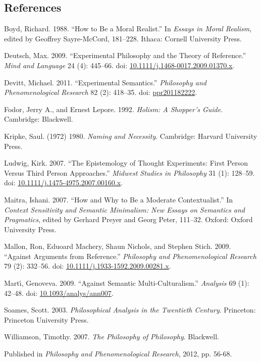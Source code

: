 \documentclass[
  11pt,
  letterpaper,
  DIV=11,
  numbers=noendperiod,
  twoside]{scrartcl}
\newlength{\cslhangindent}
\newenvironment{CSLReferences}[2] %
 {\begin{list}{}{%
  \setlength{\itemindent}{0pt}
  \setlength{\leftmargin}{0pt}
  \setlength{\parsep}{0pt}
  \ifodd #1
   \setlength{\leftmargin}{\cslhangindent}
   \setlength{\itemindent}{-1\cslhangindent}
  \fi
  \setlength{\itemsep}{#2\baselineskip}}}
 {\end{list}}
\begin{document}
\subsection*{References}\label{references}

\label{refs}
\begin{CSLReferences}{1}{0}
Boyd, Richard. 1988. {``How to Be a Moral Realist.''} In \emph{Essays in
Moral Realism}, edited by Geoffrey Sayre-McCord, 181--228. Ithaca:
Cornell University Press.

Deutsch, Max. 2009. {``Experimental Philosophy and the Theory of
Reference.''} \emph{Mind and Language} 24 (4): 445--66. doi:
\href{https://doi.org/10.1111/j.1468-0017.2009.01370.x}{10.1111/j.1468-0017.2009.01370.x}.

Devitt, Michael. 2011. {``Experimental Semantics.''} \emph{Philosophy
and Phenomenological Research} 82 (2): 418--35. doi:
\href{https://doi.org/ppr201182222}{ppr201182222}.

Fodor, Jerry A., and Ernest Lepore. 1992. \emph{Holism: A Shopper's
Guide}. Cambridge: Blackwell.

Kripke, Saul. (1972) 1980. \emph{Naming and Necessity}. Cambridge:
Harvard University Press.

Ludwig, Kirk. 2007. {``The Epistemology of Thought Experiments: First
Person Versus Third Person Approaches.''} \emph{Midwest Studies in
Philosophy} 31 (1): 128--59. doi:
\href{https://doi.org/10.1111/j.1475-4975.2007.00160.x}{10.1111/j.1475-4975.2007.00160.x}.

Maitra, Ishani. 2007. {``How and Why to Be a Moderate Contextualist.''}
In \emph{Context Sensitivity and Semantic Minimalism: New Essays on
Semantics and Pragmatics}, edited by Gerhard Preyer and Georg Peter,
111--32. Oxford: Oxford University Press.

Mallon, Ron, Eduoard Machery, Shaun Nichols, and Stephen Stich. 2009.
{``Against Arguments from Reference.''} \emph{Philosophy and
Phenomenological Research} 79 (2): 332--56. doi:
\href{https://doi.org/10.1111/j.1933-1592.2009.00281.x}{10.1111/j.1933-1592.2009.00281.x}.

Martı́, Genoveva. 2009. {``Against Semantic Multi-Culturalism.''}
\emph{Analysis} 69 (1): 42--48. doi:
\href{https://doi.org/10.1093/analys/ann007}{10.1093/analys/ann007}.

Soames, Scott. 2003. \emph{Philosophical Analysis in the Twentieth
Century}. Princeton: Princeton University Press.

Williamson, Timothy. 2007. \emph{{The Philosophy of Philosophy}}.
Blackwell.

\end{CSLReferences}



\noindent Published in\emph{
Philosophy and Phenomenological Research}, 2012, pp. 56-68.
\end{document}
